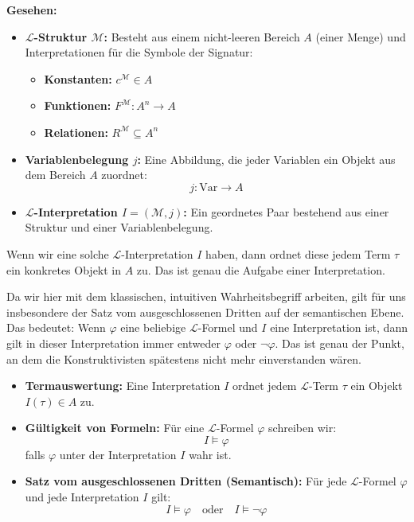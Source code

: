 \begin{math-stroke}
\textbf{Gesehen:}
\begin{itemize}
    \item \textbf{$\mathcal{L}$-Struktur $\mathcal{M}$:} Besteht aus einem nicht-leeren Bereich $A$ (einer Menge) und Interpretationen für die Symbole der Signatur:
    \begin{itemize}
        \item \textbf{Konstanten:} $c^{\mathcal{M}} \in A$
        \item \textbf{Funktionen:} $F^{\mathcal{M}} \colon A^n \to A$
        \item \textbf{Relationen:} $R^{\mathcal{M}} \subseteq A^n$
    \end{itemize}
    \item \textbf{Variablenbelegung $j$:} Eine Abbildung, die jeder Variablen ein Objekt aus dem Bereich $A$ zuordnet:
    \[ j \colon \text{Var} \to A \]
    \item \textbf{$\mathcal{L}$-Interpretation $I = (\mathcal{M}, j)$:} Ein geordnetes Paar bestehend aus einer Struktur und einer Variablenbelegung.
\end{itemize}
\end{math-stroke}

\begin{spoken-clean}[00:07:47 - 00:09:40]
Wenn wir eine solche $\mathcal{L}$-Interpretation $I$ haben, dann ordnet diese jedem Term $\tau$ ein konkretes Objekt in $A$ zu. Das ist genau die Aufgabe einer Interpretation.

Da wir hier mit dem klassischen, intuitiven Wahrheitsbegriff arbeiten, gilt für uns insbesondere der Satz vom ausgeschlossenen Dritten auf der semantischen Ebene. Das bedeutet: Wenn $\varphi$ eine beliebige $\mathcal{L}$-Formel und $I$ eine Interpretation ist, dann gilt in dieser Interpretation immer entweder $\varphi$ oder $\neg\varphi$. Das ist genau der Punkt, an dem die Konstruktivisten spätestens nicht mehr einverstanden wären.
\end{spoken-clean}

\begin{math-stroke}
\begin{itemize}
    \item \textbf{Termauswertung:} Eine Interpretation $I$ ordnet jedem $\mathcal{L}$-Term $\tau$ ein Objekt $I(\tau) \in A$ zu.
    \item \textbf{Gültigkeit von Formeln:} Für eine $\mathcal{L}$-Formel $\varphi$ schreiben wir:
    \[ I \models \varphi \]
    falls $\varphi$ unter der Interpretation $I$ wahr ist.
    \item \textbf{Satz vom ausgeschlossenen Dritten (Semantisch):} Für jede $\mathcal{L}$-Formel $\varphi$ und jede Interpretation $I$ gilt:
    \[ I \models \varphi \quad \text{oder} \quad I \models \neg \varphi \]
\end{itemize}
\end{math-stroke}

